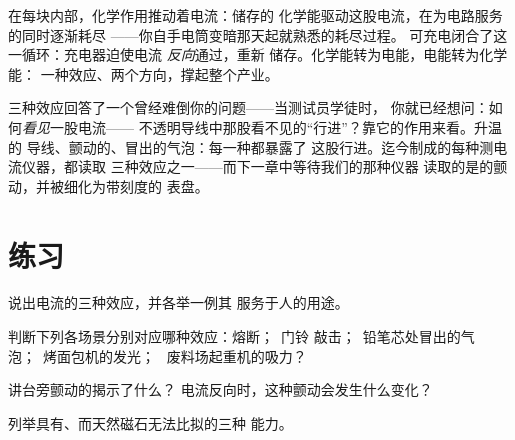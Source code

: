 \begin{example}[每块电池都是化学效应的逆过程]\label{ex:g8:electric-current-effects:battery}
在每块内部，化学作用推动着电流：储存的
化学能驱动这股电流，在为电路服务的同时逐渐耗尽
——你自手电筒变暗那天起就熟悉的耗尽过程。
可充电闭合了这一循环：充电器迫使电流
\emph{反向}通过，重新
储存。化学能转为电能，电能转为化学能：
一种效应、两个方向，撑起整个产业。
\end{example}

\begin{remark}[作为探测器的效应]\label{rem:g8:electric-current-effects:detect}
三种效应回答了一个曾经难倒你的问题——当测试员学徒时，
你就已经想问：如何\emph{看见}一股电流——
不透明导线中那股看不见的“行进”？靠它的作用来看。升温的
导线、颤动的、冒出的气泡：每一种都暴露了
这股行进。迄今制成的每种测电流仪器，都读取
三种效应之一——而下一章中等待我们的那种仪器
读取的是的颤动，并被细化为带刻度的
表盘。
\end{remark}

\section{练习}

\begin{exercise}[$\star$]\label{exo:g8:electric-current-effects:1}
说出电流的三种效应，并各举一例其
服务于人的用途。
\end{exercise}

\begin{exercise}[$\star$]\label{exo:g8:electric-current-effects:2}
判断下列各场景分别对应哪种效应：熔断；\ 门铃
敲击；\ 铅笔芯处冒出的气泡；\ 烤面包机的发光；
\ 废料场起重机的吸力？
\end{exercise}

\begin{exercise}[$\star$]\label{exo:g8:electric-current-effects:3}
讲台旁颤动的揭示了什么？
电流反向时，这种颤动会发生什么变化？
\end{exercise}

\begin{exercise}[$\star$]\label{exo:g8:electric-current-effects:4}
列举具有、而天然磁石无法比拟的三种
能力。
\end{exercise}

